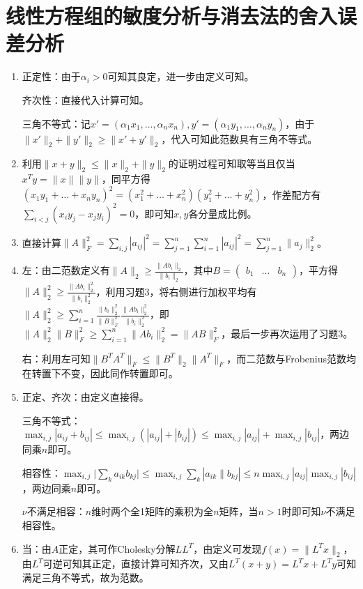 \documentclass[a4paper,UTF8,fontset=windows]{ctexart}
\begin{document}
\section{线性方程组的敏度分析与消去法的舍入误差分析}
\begin{enumerate}
\item
正定性：由于$\alpha_i>0$可知其良定，进一步由定义可知。

齐次性：直接代入计算可知。

三角不等式：记$x'=(\alpha_1x_1,\dots,\alpha_nx_n),y'=(\alpha_1y_1,\dots,\alpha_ny_n)$，由于$\|x'\|_2+\|y'\|_2\ge\|x'+y'\|_2$，代入可知此范数具有三角不等式。

\item
利用$\|x+y\|_2\le\|x\|_2+\|y\|_2$的证明过程可知取等当且仅当$x^Ty=\|x\|\|y\|$，同平方得$(x_1y_1+\dots+x_ny_n)^2=(x_1^2+\dots+x_n^2)(y_1^2+\dots+y_n^2)$，作差配方有$\sum_{i<j}(x_iy_j-x_jy_i)^2=0$，即可知$x,y$各分量成比例。

\item
直接计算$\|A\|_F^2=\sum_{i,j}|a_{ij}|^2=\sum_{j=1}^n\sum_{i=1}^n|a_{ij}|^2=\sum_{j=1}^n\|a_j\|_2^2$。

\item
左：由二范数定义有$\|A\|_2\ge\frac{\|Ab_i\|_2}{\|b_i\|_2}$，其中$B=\begin{pmatrix}b_1&\dots&b_n\end{pmatrix}$，平方得$\|A\|_2^2\ge\frac{\|Ab_i\|_2^2}{\|b_i\|_2^2}$，利用习题3，将右侧进行加权平均有$\|A\|_2^2\ge\sum_{i=1}^n\frac{\|b_i\|_2^2}{\|B\|_F^2}\frac{\|Ab_i\|_2^2}{\|b_i\|_2^2}$，即$\|A\|_2^2\|B\|_F^2\ge\sum_{i=1}^n\|Ab_i\|_2^2=\|AB\|_F^2$，最后一步再次运用了习题3。

右：利用左可知$\|B^TA^T\|_F\le\|B^T\|_2\|A^T\|_F$，而二范数与Frobenius范数均在转置下不变，因此同作转置即可。

\item
正定、齐次：由定义直接得。

三角不等式：$\max_{i,j}|a_{ij}+b_{ij}|\le\max_{i,j}(|a_{ij}|+|b_{ij}|)\le\max_{i,j}|a_{ij}|+\max_{i,j}|b_{ij}|$，两边同乘$n$即可。

相容性：$\max_{i,j}\big|\sum_ka_{ik}b_{kj}\big|\le\max_{i,j}\sum_k|a_{ik}\|b_{kj}|\le n\max_{i,j}|a_{ij}|\max_{i,j}|b_{ij}|$，两边同乘$n$即可。

$\nu$不满足相容：$n$维时两个全1矩阵的乘积为全$n$矩阵，当$n>1$时即可知$\nu$不满足相容性。

\item
当：由$A$正定，其可作Cholesky分解$LL^T$，由定义可发现$f(x)=\|L^Tx\|_2$，由$L^T$可逆可知其正定，直接计算可知齐次，又由$L^T(x+y)=L^Tx+L^Ty$可知满足三角不等式，故为范数。


\end{enumerate}
\end{document}
